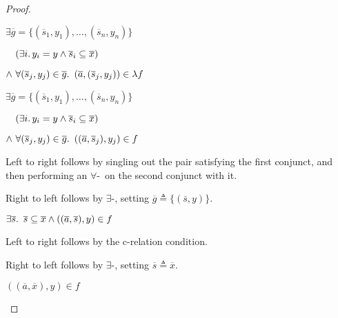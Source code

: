 \begin{prop}
\begin{proof}
\begin{itemize}
      \step[\iffs]
        $\exists\overline{g} = \{(\overline{s}_1,y_1),\ldots,(\overline{s}_n,y_n)\}$

      \addtolength{\itemsep}{-.3\baselineskip}
      \step
        \quad$\phantom{\land}~(\exists i\ldotp y_i=y\land\overline{s}_i\subseteq\overline{x})$

      \step
        \quad$\land~\forall(\overline{s}_j,y_j)\in\overline{g}\ldotp~(\overline{a},(\overline{s}_j, y_j))\in\lambda f$

      \addtolength{\itemsep}{.3\baselineskip}

      \step[\iffs]
        $\exists\overline{g} = \{(\overline{s}_1,y_1),\ldots,(\overline{s}_n,y_n)\}$

      \addtolength{\itemsep}{-.3\baselineskip}
      \step
        \quad$\phantom{\land}~(\exists i\ldotp y_i=y\land\overline{s}_i\subseteq\overline{x})$

      \step
        \quad$\land~\forall(\overline{s}_j,y_j)\in\overline{g}\ldotp~((\overline{a},\overline{s}_j), y_j)\in f$
        \marginnote{\Def-$\lambda\cdot$}

      \addtolength{\itemsep}{.3\baselineskip}

      \step
        Left to right follows by singling out the pair satisfying the first conjunct, and then performing an $\forall$-\Elim~on the second conjunct with it.

      \step
        Right to left follows by $\exists$-\Intro, setting $\overline{g}\triangleq\{(\overline{s},y)\}$.

      \step[\iffs]
        $\exists\overline{s}\ldotp~\overline{s}\subseteq\overline{x}\land((\overline{a},\overline{s}),y)\in f$

      \step
        Left to right follows by the c-relation condition.

      \step
        Right to left follows by $\exists$-\Intro, setting $\overline{s}\triangleq\overline{x}$.

      \step[\iffs]
        $((\overline{a},\overline{x}),y)\in f$
        \qedhere
    \end{itemize}
  \end{proof}
\end{prop}

